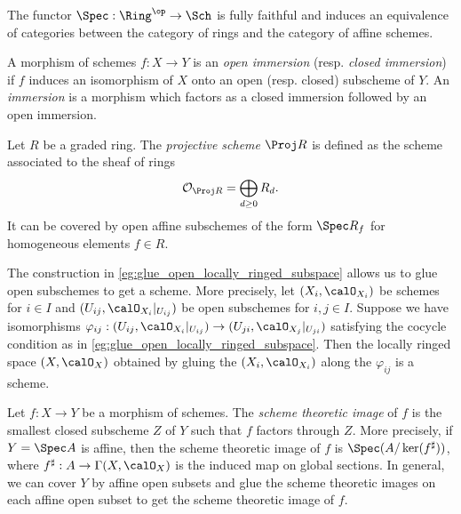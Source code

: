     \begin{theorem}\label{thm:equivalence_between_rings_and_affine_schemes}
        The functor \(\Spec : \Ring^{\op} \to \Sch\) is fully faithful and induces an equivalence of categories between the category of rings and the category of affine schemes.
    \end{theorem}

    \begin{definition}\label{def:open_and_closed_immersion}
        A morphism of schemes \(f : X \to Y\) is an \emph{open immersion} (resp. \emph{closed immersion}) if \(f\) induces an isomorphism of \(X\) onto an open (resp. closed) subscheme of \(Y\).
        An \emph{immersion} is a morphism which factors as a closed immersion followed by an open immersion.
    \end{definition}

    \begin{example}\label{eg:projective_scheme_Proj_of_graded_rings_as_schemes}
        Let \(R\) be a graded ring. The \emph{projective scheme} \(\Proj R\) is defined as the scheme associated to the sheaf of rings
        \[
            \mathcal{O}_{\Proj R} = \bigoplus_{d \geq 0} R_d.
        \]
        It can be covered by open affine subschemes of the form \(\Spec R_f\) for homogeneous elements \(f \in R\).
    \end{example}

    \begin{example}\label{eg:glue_open_subschemes}
        The construction in \cref{eg:glue_open_locally_ringed_subspace} allows us to glue open subschemes to get a scheme.
        More precisely, let \((X_i, \calO_{X_i})\) be schemes for \(i \in I\) and \((U_{ij}, \calO_{X_i}|_{U_{ij}})\) be open subschemes for \(i,j \in I\).
        Suppose we have isomorphisms \(\varphi_{ij} : (U_{ij}, \calO_{X_i}|_{U_{ij}}) \to (U_{ji}, \calO_{X_j}|_{U_{ji}})\) satisfying the cocycle condition as in \cref{eg:glue_open_locally_ringed_subspace}.
        Then the locally ringed space \((X, \calO_X)\) obtained by gluing the \((X_i, \calO_{X_i})\) along the \(\varphi_{ij}\) is a scheme.
    \end{example}

    \begin{definition}\label{def:scheme_theoretic_image}
        Let \(f : X \to Y\) be a morphism of schemes.
        The \emph{scheme theoretic image} of \(f\) is the smallest closed subscheme \(Z\) of \(Y\) such that \(f\) factors through \(Z\).
        More precisely, if \(Y = \Spec A\) is affine, then the scheme theoretic image of \(f\) is \(\Spec(A/\ker(f^\sharp))\), where \(f^\sharp : A \to \Gamma(X, \calO_X)\) is the induced map on global sections.
        In general, we can cover \(Y\) by affine open subsets and glue the scheme theoretic images on each affine open subset to get the scheme theoretic image of \(f\).
    \end{definition}

